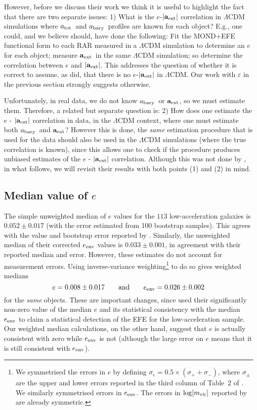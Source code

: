 \documentclass[usenatbib]{mnras}
\newcommand{\atot}{\ensuremath{a_{\rm tot}}}
\newcommand{\abary}{\ensuremath{a_{\rm bary}}}
\newcommand{\aext}{\ensuremath{\mathbf{a}_{\rm ext}}}
\begin{document}
However, before we discuss their work we think it is useful to highlight the fact that there are two separate issues:  
1) What is the $e$-$|\aext|$ correlation in $\Lambda$CDM simulations where \atot\ and \abary\ profiles are known for each object?  E.g., one could, and we believe  should, have done the following:  
Fit the MOND+EFE functional form to each RAR measured in a $\Lambda$CDM simulation to determine an $e$ for each object; measure \aext\ in the same $\Lambda$CDM simulation; so determine the correlation between $e$ and $|\aext|$.  This addresses the question of whether it is correct to assume, as  did, that there is no $e$-$|\aext|$ in $\Lambda$CDM.  Our work with $\varepsilon$ in the previous section strongly suggests otherwise.  

Unfortunately, in real data, we do not know \abary\ or \aext, so we must estimate them.  Therefore, a related but separate question is: 
2) How does one estimate the $e$ - $|\aext|$ correlation in data, in the $\Lambda$CDM context, where one must estimate both \abary\ and \aext?  However this is done, the {\em same} estimation procedure that is used for the data should also be used in the $\Lambda$CDM simulations (where the true correlation is known), since this allows one to check if the procedure produces unbiased estimates of the $e$ - $|\aext|$ correlation.  Although this was not done by , in what follows, we will revisit their results with both points (1) and (2) in mind.  

\subsection{Median value of $e$}
The simple unweighted median of $e$ values for the $113$ low-acceleration galaxies is $0.052\pm0.017$ (with the error estimated from 100 bootstrap samples).  This agrees with the value and bootstrap error reported by . Similarly, the unweighted median of their corrected $e_{\rm env}$ values is $0.033\pm0.001$, in agreement with their reported median and error.  However, these estimates do not account for measurement errors.   
Using inverse-variance weighting\footnote{We symmetrised the errors in $e$ by defining $\sigma_e = 0.5\times(\sigma_++\sigma_-)$, where $\sigma_\pm$ are the upper and lower errors reported in the third column of Table~2 of \citet{efe-erratum}. We similarly symmetrised errors in $e_{\rm env}$. The errors in $\log[m_{\rm vir}]$ reported by \citet{llms20} are already symmetric.} 
to do so gives weighted medians 
$$e = 0.008\pm0.017 \qquad {\rm and}\qquad e_{\rm env} = 0.026\pm0.002$$ 
for the \emph{same} objects.  These are important changes, since  used their significantly non-zero value of the median $e$ and its statistical consistency with the median $e_{\rm env}$ to claim a statistical detection of the EFE for the low-acceleration sample. Our weighted median calculations, on the other hand, suggest that $e$ is actually consistent with zero while $e_{\rm env}$ is not (although the large error on $e$ means that it is still consistent with $e_{\rm env}$). 
\end{document}
